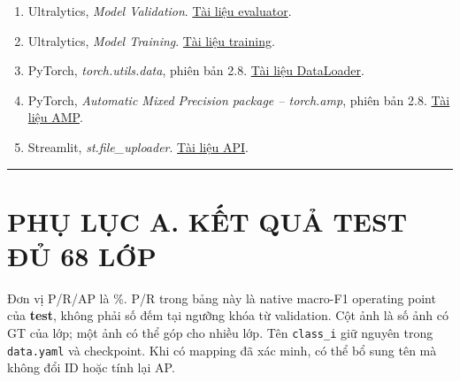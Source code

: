 \documentclass[
  vietnamese,
  12pt,
  a4paper,
]{article}
\begin{document}
\begin{enumerate}
  FoodDetector.
  \href{https://raw.githubusercontent.com/nvhnam/FoodDetector/v2/class_names.py}{Mã
  nguồn danh sách lớp}.
\item
  Ultralytics, \emph{Model Validation}.
  \href{https://docs.ultralytics.com/modes/val/}{Tài liệu evaluator}.
\item
  Ultralytics, \emph{Model Training}.
  \href{https://docs.ultralytics.com/modes/train/}{Tài liệu training}.
\item
  PyTorch, \emph{torch.utils.data}, phiên bản 2.8.
  \href{https://docs.pytorch.org/docs/2.8/data.html}{Tài liệu
  DataLoader}.
\item
  PyTorch, \emph{Automatic Mixed Precision package -- torch.amp}, phiên
  bản 2.8. \href{https://docs.pytorch.org/docs/2.8/amp.html}{Tài liệu
  AMP}.
\item
  Streamlit, \emph{st.file\_uploader}.
  \href{https://docs.streamlit.io/develop/api-reference/widgets/st.file_uploader}{Tài
  liệu API}.
\end{enumerate}

\begin{center}\rule{0.5\linewidth}{0.5pt}\end{center}

\section{PHỤ LỤC A. KẾT QUẢ TEST ĐỦ 68
LỚP}\label{phux1ee5-lux1ee5c-a.-kux1ebft-quux1ea3-test-ux111ux1ee7-68-lux1edbp}

Đơn vị P/R/AP là \%. P/R trong bảng này là native macro-F1 operating
point của \textbf{test}, không phải số đếm tại ngưỡng khóa từ
validation. Cột ảnh là số ảnh có GT của lớp; một ảnh có thể góp cho
nhiều lớp. Tên
\texttt{c\allowbreak{}l\allowbreak{}a\allowbreak{}s\allowbreak{}s\allowbreak{}\_\allowbreak{}i\allowbreak{}}
giữ nguyên trong
\texttt{d\allowbreak{}a\allowbreak{}t\allowbreak{}a\allowbreak{}.\allowbreak{}y\allowbreak{}a\allowbreak{}m\allowbreak{}l\allowbreak{}}
và checkpoint. Khi có mapping đã xác minh, có thể bổ sung tên mà không
đổi ID hoặc tính lại AP.

\begingroup\small\setlength{\tabcolsep}{4pt}\renewcommand{\arraystretch}{1.12}
\end{document}
